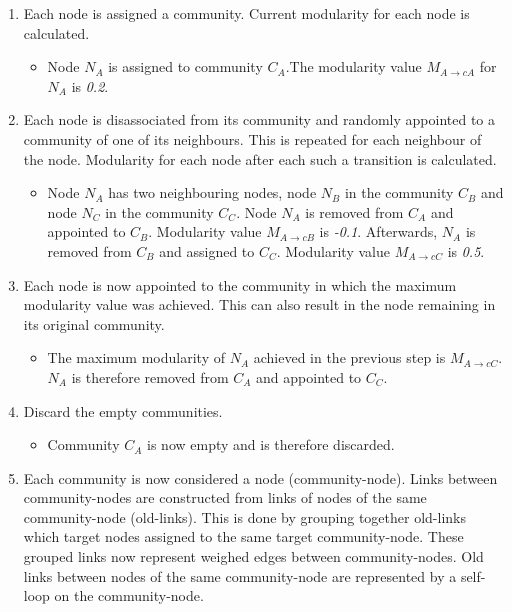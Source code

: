 \begin{enumerate} 
  \label{louvainAlgorithmPrinciple}
  \item  Each node is assigned a community. Current modularity for each node is calculated. 
  \begin{itemize}
    \item Node $N_{A}$ is assigned to community $C_{A}$.The modularity value $M_{A\rightarrow cA}$ for $N_{A}$ is \textit{0.2}.
  \end{itemize} 
  \item Each node is disassociated from its community and randomly appointed to a community of one of its neighbours. This is repeated for each neighbour of the node. Modularity for each node after each such a transition is calculated.
  \begin{itemize}
    \item Node $N_{A}$ has two neighbouring nodes, node $N_{B}$ in the community $C_{B}$ and node $N_{C}$ in the community $C_{C}$. Node $N_{A}$ is removed from $C_{A}$ and appointed to $C_{B}$. Modularity value $M_{A\rightarrow cB}$ is \textit{-0.1}. Afterwards, $N_{A}$ is removed from $C_{B}$ and assigned to $C_{C}$. Modularity value $M_{A\rightarrow cC}$ is \textit{0.5}. 
  \end{itemize} 
  \item Each node is now appointed to the community in which the maximum modularity value was achieved. This can also result in the node remaining in its original community.
  \begin{itemize}
    \item The maximum modularity of $N_{A}$ achieved in the previous step is $M_{A\rightarrow cC}$. $N_{A}$ is therefore removed from $C_{A}$ and appointed to $C_{C}$.
  \end{itemize} 
  \item Discard the empty communities. 
  \begin{itemize}
    \item Community $C_{A}$ is now empty and is therefore discarded.
  \end{itemize} 
  \item Each community is now considered a node (community-node). Links between community-nodes are constructed from links of nodes of the same community-node (old-links). This is done by grouping together old-links which target nodes assigned to the same target community-node. These grouped links now represent weighed edges between community-nodes. Old links between nodes of the same community-node are represented  by a self-loop on the community-node.

\end{enumerate}
